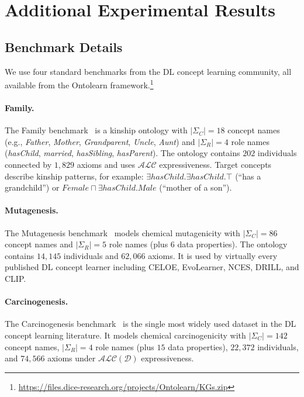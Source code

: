 \documentclass[accepted]{uai2026} %
\theoremstyle{definition}
\theoremstyle{remark}
\begin{document}
\section{Additional Experimental Results}\label{app:experiments}

\subsection{Benchmark Details}\label{app:bench}

We use four standard benchmarks from the DL concept
learning community, all available from the Ontolearn
framework.\footnote{\url{https://files.dice-research.org/projects/Ontolearn/KGs.zip}}

\paragraph{Family.}
The Family benchmark~\citep{DBLP:conf/www/HeindorfBDWGDN22} is a
kinship ontology with $|\Sigma_C| = 18$ concept names
(e.g., \textit{Father}, \textit{Mother}, \textit{Grandparent},
\textit{Uncle}, \textit{Aunt}) and $|\Sigma_R| = 4$ role names
(\textit{hasChild}, \textit{married}, \textit{hasSibling},
\textit{hasParent}).
The ontology contains $202$ individuals connected by $1{,}829$
axioms and uses $\mathcal{ALC}$ expressiveness.
Target concepts describe kinship patterns, for example:
$\exists \mathit{hasChild}.\exists \mathit{hasChild}.\top$
(``has a grandchild'') or
$\mathit{Female} \sqcap \exists \mathit{hasChild}.\mathit{Male}$
(``mother of a son'').

\paragraph{Mutagenesis.}
The Mutagenesis
benchmark~\citep{DBLP:journals/semweb/WestphalBBJL19} models
chemical mutagenicity with $|\Sigma_C| = 86$ concept names
and $|\Sigma_R| = 5$ role names (plus $6$ data properties).
The ontology contains $14{,}145$ individuals and $62{,}066$
axioms.  It is used by virtually every published DL concept learner
including CELOE, EvoLearner, NCES, DRILL, and CLIP.

\paragraph{Carcinogenesis.}
The Carcinogenesis
benchmark~\citep{DBLP:journals/semweb/WestphalBBJL19} is the
single most widely used dataset in the DL concept learning
literature.  It models chemical carcinogenicity with
$|\Sigma_C| = 142$ concept names, $|\Sigma_R| = 4$ role
names (plus $15$ data properties), $22{,}372$ individuals,
and $74{,}566$ axioms under $\mathcal{ALC}(\mathcal{D})$
expressiveness.
\end{document}
